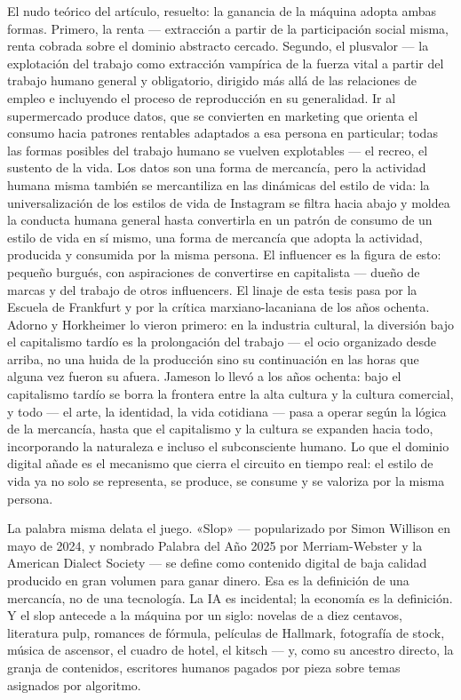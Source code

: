 \documentclass[11pt]{article}
\begin{document}
El nudo teórico del artículo, resuelto: la ganancia de la máquina
adopta ambas formas. Primero, la renta --- extracción a partir de la
participación social misma, renta cobrada sobre el dominio abstracto
cercado. Segundo, el plusvalor --- la explotación del trabajo como
extracción vampírica de la fuerza vital a partir del trabajo humano
general y obligatorio, dirigido más allá de las relaciones de empleo e
incluyendo el proceso de reproducción en su generalidad. Ir al
supermercado produce datos, que se convierten en marketing que orienta
el consumo hacia patrones rentables adaptados a esa persona en
particular; todas las formas posibles del trabajo humano se vuelven
explotables --- el recreo, el sustento de la vida. Los datos son una
forma de mercancía, pero la actividad humana misma también se
mercantiliza en las dinámicas del estilo de vida: la universalización
de los estilos de vida de Instagram se filtra hacia abajo y moldea la
conducta humana general hasta convertirla en un patrón de consumo de un
estilo de vida en sí mismo, una forma de mercancía que adopta la
actividad, producida y consumida por la misma persona. El influencer es
la figura de esto: pequeño burgués, con aspiraciones de convertirse en
capitalista --- dueño de marcas y del trabajo de otros influencers. El
linaje de esta tesis pasa por la Escuela de Frankfurt y por la crítica
marxiano-lacaniana de los años ochenta. Adorno y Horkheimer lo vieron
primero: en la industria cultural, la diversión bajo el capitalismo
tardío es la prolongación del trabajo --- el ocio organizado desde
arriba, no una huida de la producción sino su continuación en las horas
que alguna vez fueron su afuera. Jameson lo llevó a los años ochenta:
bajo el capitalismo tardío se borra la frontera entre la alta cultura y
la cultura comercial, y todo --- el arte, la identidad, la vida
cotidiana --- pasa a operar según la lógica de la mercancía, hasta que
el capitalismo y la cultura se expanden hacia todo, incorporando la
naturaleza e incluso el subconsciente humano. Lo que el dominio digital
añade es el mecanismo que cierra el circuito en tiempo real: el estilo
de vida ya no solo se representa, se produce, se consume y se valoriza
por la misma persona.

La palabra misma delata el juego. «Slop» --- popularizado por Simon
Willison en mayo de 2024, y nombrado Palabra del Año 2025 por
Merriam-Webster y la American Dialect Society --- se define como
contenido digital de baja calidad producido en gran volumen para ganar
dinero. Esa es la definición de una mercancía, no de una tecnología. La
IA es incidental; la economía es la definición. Y el slop antecede a la
máquina por un siglo: novelas de a diez centavos, literatura pulp,
romances de fórmula, películas de Hallmark, fotografía de stock, música
de ascensor, el cuadro de hotel, el kitsch --- y, como su ancestro
directo, la granja de contenidos, escritores humanos pagados por pieza
sobre temas asignados por algoritmo.
\end{document}
